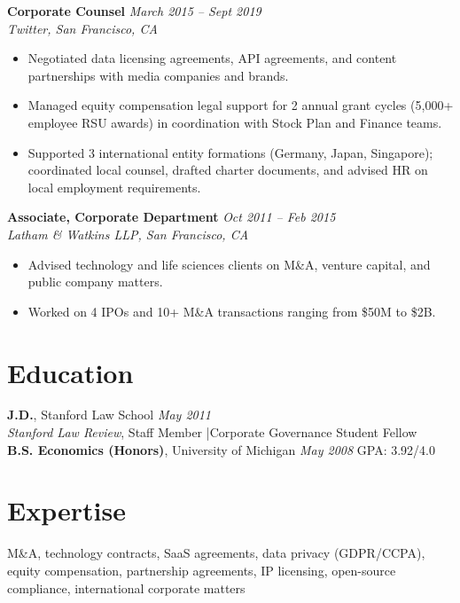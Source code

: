 \documentclass[11pt,a4paper]{article}
\begin{document}
\vspace{4pt}
\noindent\textbf{Corporate Counsel} \hfill \textit{March 2015 -- Sept 2019}\\
\textit{Twitter, San Francisco, CA}
\begin{itemize}
  \item Negotiated data licensing agreements, API agreements, and content partnerships with media companies and brands.
  \item Managed equity compensation legal support for 2 annual grant cycles (5,000+ employee RSU awards) in coordination with Stock Plan and Finance teams.
  \item Supported 3 international entity formations (Germany, Japan, Singapore); coordinated local counsel, drafted charter documents, and advised HR on local employment requirements.
\end{itemize}

\vspace{4pt}
\noindent\textbf{Associate, Corporate Department} \hfill \textit{Oct 2011 -- Feb 2015}\\
\textit{Latham \& Watkins LLP, San Francisco, CA}
\begin{itemize}
  \item Advised technology and life sciences clients on M\&A, venture capital, and public company matters.
  \item Worked on 4 IPOs and 10+ M\&A transactions ranging from \$50M to \$2B.
\end{itemize}

\section{Education}
\textbf{J.D.}, Stanford Law School \hfill \textit{May 2011}\\
\textit{Stanford Law Review}, Staff Member \quad|\quad Corporate Governance Student Fellow\\[3pt]
\textbf{B.S. Economics (Honors)}, University of Michigan \hfill \textit{May 2008} \quad GPA: 3.92/4.0

\section{Expertise}
M\&A, technology contracts, SaaS agreements, data privacy (GDPR/CCPA), equity compensation, partnership agreements, IP licensing, open-source compliance, international corporate matters
\end{document}
